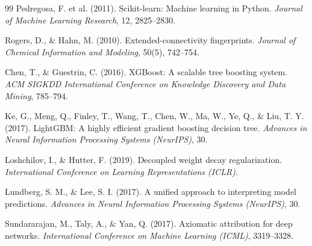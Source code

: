 \documentclass[10pt,twocolumn]{article}
\begin{document}
\begin{thebibliography}{99}
 Pedregosa, F. et al. (2011). Scikit-learn: Machine learning in Python. \textit{Journal of Machine Learning Research}, 12, 2825--2830.

 Rogers, D., \& Hahn, M. (2010). Extended-connectivity fingerprints. \textit{Journal of Chemical Information and Modeling}, 50(5), 742--754.

 Chen, T., \& Guestrin, C. (2016). XGBoost: A scalable tree boosting system. \textit{ACM SIGKDD International Conference on Knowledge Discovery and Data Mining}, 785--794.

 Ke, G., Meng, Q., Finley, T., Wang, T., Chen, W., Ma, W., Ye, Q., \& Liu, T. Y. (2017). LightGBM: A highly efficient gradient boosting decision tree. \textit{Advances in Neural Information Processing Systems (NeurIPS)}, 30.

 Loshchilov, I., \& Hutter, F. (2019). Decoupled weight decay regularization. \textit{International Conference on Learning Representations (ICLR)}.

 Lundberg, S. M., \& Lee, S. I. (2017). A unified approach to interpreting model predictions. \textit{Advances in Neural Information Processing Systems (NeurIPS)}, 30.

 Sundararajan, M., Taly, A., \& Yan, Q. (2017). Axiomatic attribution for deep networks. \textit{International Conference on Machine Learning (ICML)}, 3319--3328.

\end{thebibliography}
\end{document}
